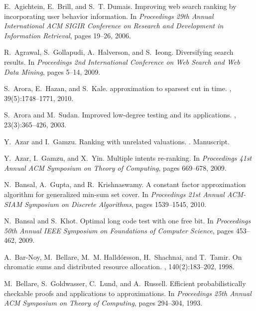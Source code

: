 \documentclass[11pt]{article}
\theoremstyle{plain}
\theoremstyle{definition}
\begin{document}
\begin{thebibliography}{10}

E.~Agichtein, E.~Brill, and S.~T. Dumais.
\newblock Improving web search ranking by incorporating user behavior
  information.
\newblock In {\em Proceedings 29th Annual International ACM SIGIR Conference on
  Research and Development in Information Retrieval}, pages 19--26, 2006.

R.~Agrawal, S.~Gollapudi, A.~Halverson, and S.~Ieong.
\newblock Diversifying search results.
\newblock In {\em Proceedings 2nd International Conference on Web Search and
  Web Data Mining}, pages 5--14, 2009.

S.~Arora, E.~Hazan, and S.~Kale.
\newblock  approximation to sparsest cut in
   time.
, 39(5):1748--1771, 2010.

S.~Arora and M.~Sudan.
\newblock Improved low-degree testing and its applications.
, 23(3):365--426, 2003.

Y.~Azar and I.~Gamzu.
\newblock Ranking with unrelated valuations.
.
\newblock Manuscript.

Y.~Azar, I.~Gamzu, and X.~Yin.
\newblock Multiple intents re-ranking.
\newblock In {\em Proceedings 41st Annual ACM Symposium on Theory of
  Computing}, pages 669--678, 2009.

N.~Bansal, A.~Gupta, and R.~Krishnaswamy.
\newblock A constant factor approximation algorithm for generalized min-sum set
  cover.
\newblock In {\em Proceedings 21st Annual ACM-SIAM Symposium on Discrete
  Algorithms}, pages 1539--1545, 2010.

N.~Bansal and S.~Khot.
\newblock Optimal long code test with one free bit.
\newblock In {\em Proceedings 50th Annual IEEE Symposium on Foundations of
  Computer Science}, pages 453--462, 2009.

A.~Bar-Noy, M.~Bellare, M.~M. Halld{\'o}rsson, H.~Shachnai, and
T.~Tamir.
\newblock On chromatic sums and distributed resource allocation.
, 140(2):183--202, 1998.

M.~Bellare, S.~Goldwasser, C.~Lund, and A.~Russell.
\newblock Efficient probabilistically checkable proofs and applications to
  approximations.
\newblock In {\em Proceedings 25th Annual ACM Symposium on Theory of
  Computing}, pages 294--304, 1993.


\end{thebibliography}
\end{document}
